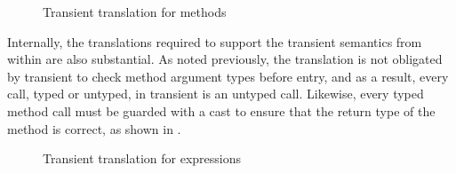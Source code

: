 \documentclass[a4paper,USenglish]{tex/lipics-v2016}
\begin{document}
\begin{figure}
\begin{mathpar}

\end{mathpar}
\caption{Transient translation for methods}
\label{fig:tratrans_cla}
\end{figure}

Internally, the translations required to support the transient semantics from
within \kafKa are also substantial.  As noted previously, the translation is not
obligated by transient to check method argument types before entry, and as a
result, every call,  typed or untyped, in transient is an untyped call.
Likewise, every typed method call must be guarded with a cast to ensure that
the return type of the method is correct, as shown in .
 
\begin{figure}
\begin{mathpar}





\end{mathpar}
\caption{Transient translation for expressions}
\label{fig:tratrans_exp}
\end{figure}
\end{document}
